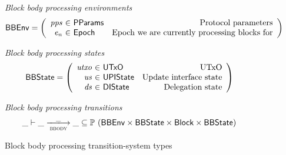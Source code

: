 \documentclass[11pt,a4paper]{article}
\newcommand{\powerset}[1]{\mathbb{P}~#1}
\newcommand{\var}[1]{\mathit{#1}}
\newcommand{\type}[1]{\mathsf{#1}}
\newcommand{\trans}[2]{\xlongrightarrow[\textsc{#1}]{#2}}
\newcommand{\Block}{\type{Block}}
\newcommand{\ProtParams}{\type{PParams}} %
\begin{document}
\begin{figure}[ht]
  \emph{Block body processing environments}
  \begin{equation*}
    \BBEnv =
    \left(
      \begin{array}{r@{~\in~}lr}
        \var{pps} & \ProtParams & \text{Protocol parameters} \\
        \var{e_n} & \Epoch & \text{Epoch we are currently processing blocks for}
      \end{array}
    \right)
  \end{equation*}

  \emph{Block body processing states}
  \begin{equation*}
    \BBState =
    \left(
      \begin{array}{r@{~\in~}lr}
        \var{utxo} & \UTxO & \text{UTxO} \\
        \var{us} & \UPIState & \text{Update interface state} \\
        \var{ds} & \DIState & \text{Delegation state}
      \end{array}
    \right)
  \end{equation*}

  \emph{Block body processing transitions}
  \begin{equation*}
    \_ \vdash \var{\_} \trans{bbody}{\_} \var{\_} \subseteq
    \powerset (\BBEnv \times \BBState \times \Block \times \BBState)
  \end{equation*}
  \caption{Block body processing transition-system types}
  \label{fig:ts-types:bbody}
\end{figure}
\end{document}
